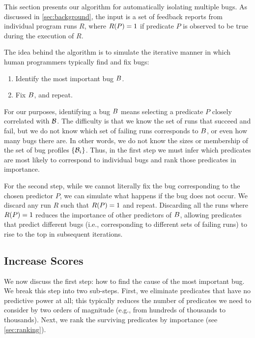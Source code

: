 This section presents our algorithm for automatically isolating
multiple bugs.  As discussed in \autoref{sec:background}, the input is
a set of feedback reports from individual program runs $R$, where
$R(P) = 1$ if predicate $P$ is observed to be true during the
execution of $R$.

The idea behind the algorithm is to simulate the iterative manner in which  human programmers
typically find and fix bugs:
\begin{enumerate}

\item Identify the most important bug $B$.

\item Fix $B$, and repeat.

\end{enumerate}

For our purposes, identifying a bug $B$ means selecting a
predicate $P$ closely correlated with $\mathcal{B}$.  The difficulty is that we
know the set of runs that succeed and fail, but we do not know which
set of failing runs corresponds to $B$, or even how many bugs there
are.  In other words, we do not know the sizes or membership of the set
of bug profiles $\{\mathcal{B}_i\}$.
Thus, in the first step we must infer which predicates are most
likely to correspond to individual bugs and rank those predicates in
importance.

For the second step, while we cannot literally fix the bug
corresponding to the chosen predictor $P$, we can simulate what
happens if the bug does not occur.  We discard any run $R$ such that
$R(P) = 1$ and repeat.  Discarding all the runs where
$R(P) = 1$ reduces the importance of other predictors of
$B$, allowing predicates that predict different bugs (i.e.,
corresponding to different sets of failing runs) to rise to the top in
subsequent iterations.

\subsection{Increase Scores}
\label{sec:increase}

We now discuss the first step: how to find the cause of the most important bug.
We break this step into two sub-steps.  First, we eliminate predicates that have no
predictive power at all; this typically reduces the number of predicates we need
to consider by two orders of magnitude (e.g., from hundreds of thousands to thousands).
Next, we rank the surviving predicates by importance (see \autoref{sec:ranking}).

